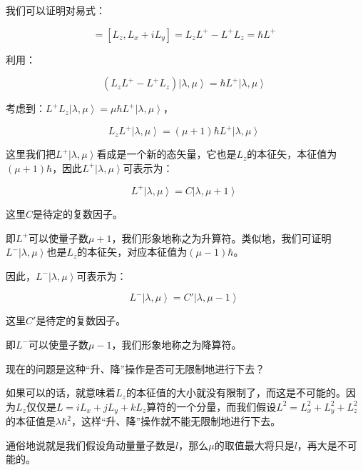 我们可以证明对易式：

\begin{equation}
[ L_z, L^+ ] = [L_z, L_x + i L_y] = L_z L^+ - L^+ L_z = \hbar L^+~
\end{equation}

利用：

\begin{equation}
( L_z L^+ - L^+ L_z ) \left| \lambda, \mu  \right\rangle = \hbar L^+ \left| \lambda, \mu \right\rangle~
\end{equation}

考虑到：$L^+ L_z \left| \lambda, \mu \right\rangle = \mu \hbar L^+ \left| \lambda, \mu \right\rangle $，

\begin{equation}
L_z L^+ \left| \lambda, \mu \right\rangle = (\mu + 1) \hbar L^+ \left| \lambda, \mu \right\rangle~
\end{equation}

这里我们把$L^+ \left| \lambda, \mu \right\rangle$看成是一个新的态矢量，它也是$L_z$的本征矢，本征值为$( \mu + 1 ) \hbar$，因此$L^+ \left| \lambda, \mu \right\rangle$可表示为：

\begin{equation}
L^+ \left| \lambda, \mu \right\rangle = C \left| \lambda, \mu+1 \right\rangle~
\end{equation}

这里$C$是待定的复数因子。

即$L^+$可以使量子数$\mu+1$，我们形象地称之为升算符。类似地，我们可证明$L^- \left| \lambda, \mu \right\rangle $也是$L_z$的本征矢，对应本征值为$(\mu-1) \hbar$。

因此，$L^- \left| \lambda, \mu \right\rangle$可表示为：

\begin{equation}
L^- \left| \lambda, \mu \right\rangle = C' \left| \lambda, \mu-1 \right\rangle~
\end{equation}

这里$C'$是待定的复数因子。

即$L^-$可以使量子数$\mu-1$，我们形象地称之为降算符。

现在的问题是这种“升、降”操作是否可无限制地进行下去？

如果可以的话，就意味着$L_z$的本征值的大小就没有限制了，而这是不可能的。因为$L_z$仅仅是$L = i L_x + j L_y + k L_z$算符的一个分量，而我们假设$L^2 = L_x^2 + L_y^2 + L_z^2$的本征值是$\lambda \hbar^2$，这样“升、降”操作就不能无限制地进行下去。

通俗地说就是我们假设角动量量子数是$l$，那么$\mu$的取值最大将只是$l$，再大是不可能的。

